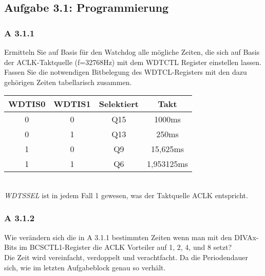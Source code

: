 \subsection*{Aufgabe 3.1: Programmierung}

\subsubsection*{A 3.1.1}
	Ermitteln Sie auf Basis für den Watchdog alle mögliche Zeiten, die sich auf Basis der ACLK-Taktquelle (f=32768Hz) mit dem WDTCTL Register einstellen 
	lassen. Fassen Sie die notwendigen Bitbelegung des WDTCL-Registers mit den dazu gehörigen Zeiten tabellarisch zusammen.\\

	\begin{center}
		\begin{tabular}{cc|cc}
			WDTIS0 & WDTIS1 & Selektiert & Takt\\
			\hline
			0 & 0 & Q15 & 1000ms\\
			0 & 1 & Q13 & 250ms\\
			1 & 0 & Q9 & 15,625ms\\
			1 & 1 & Q6 & 1,953125ms\\
			
		\end{tabular}\\
		\emph{WDTSSEL} ist in jedem Fall 1 gewesen, was der Taktquelle ACLK entspricht.
	\end{center}

\subsubsection*{A 3.1.2}
	Wie verändern sich die in A 3.1.1 bestimmten Zeiten wenn man mit den DIVAx-Bits im BCSCTL1-Register die ACLK Vorteiler auf 1, 2, 4, und 8 setzt?\\

	Die Zeit wird vereinfacht, verdoppelt und verachtfacht. Da die Periodendauer sich, wie im letzten Aufgabeblock genau so verhält.

